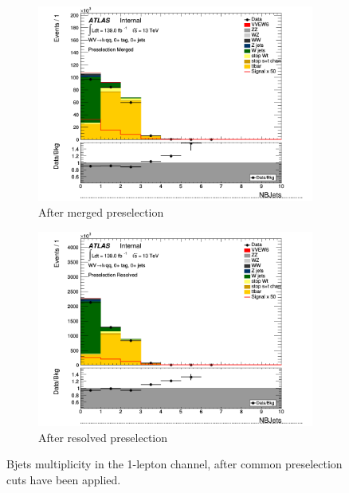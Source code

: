 \begin{figure}[ht]
    \centering
    \begin{subfigure}{0.3\textwidth}
        \includegraphics[width=\linewidth]{figures/1lep/CRPlots/C_0ptag0pjet_0ptv_Presel_Merged_NBJets_Lin.png}
        \caption{After merged preselection}
    \end{subfigure}
    \begin{subfigure}{0.3\textwidth}
        \includegraphics[width=\linewidth]{figures/1lep/CRPlots/C_0ptag0pjet_0ptv_Presel_Resolved_NBJets_Lin.png}
        \caption{After resolved preselection}
    \end{subfigure}
    \caption{Bjets multiplicity in the 1-lepton channel, after common preselection cuts have been applied.}
    \label{fig:1lepNBjetsPresel}
\end{figure}

